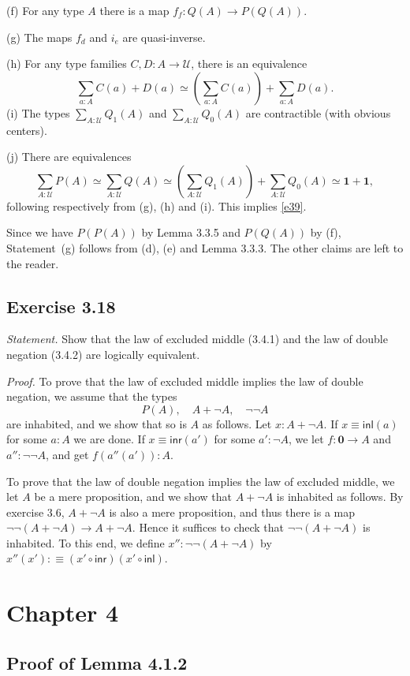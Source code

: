 \documentclass[12pt]{article}
\newcommand{\mbf}{\mathbf}
\newcommand{\msf}{\mathsf}
\newcommand{\de}{:\equiv}
\newcommand{\ee}{\equiv}
\newcommand{\nn}{\noindent}
\newcommand{\U}{\mathcal U}
\begin{document}
\nn(f) For any type $A$ there is a map $f_f:Q(A)\to P(Q(A))$.

\nn(g) The maps $f_d$ and $i_e$ are quasi-inverse.

\nn(h) For any type families $C,D:A\to\U$, there is an equivalence 
$$
\sum_{a:A}C(a)+D(a)\simeq\left(\sum_{a:A}C(a)\right)+\sum_{a:A}D(a).
$$
\nn(i) The types $\sum_{A:\U}Q_1(A)$ and $\sum_{A:\U}Q_0(A)$ are contractible (with obvious centers).

\nn(j) There are equivalences 
$$
\sum_{A:\U}P(A)\simeq\sum_{A:\U}Q(A)\simeq\left(\sum_{A:\U}Q_1(A)\right)+\sum_{A:\U}Q_0(A)\simeq\mbf1+\mbf1,
$$ 
following respectively from (g), (h) and (i). This implies \eqref{e39}.

Since we have $P(P(A))$ by Lemma 3.3.5 and $P(Q(A))$ by (f), Statement~(g) follows from (d), (e) and Lemma 3.3.3. The other claims are left to the reader.


\subsection{Exercise 3.18}

\emph{Statement.} Show that the law of excluded middle (3.4.1) and the law of double negation (3.4.2) are logically equivalent.

\nn\emph{Proof.} To prove that the law of excluded middle implies the law of double negation, we assume that the types 
$$
P(A),\quad A+\neg A,\quad \neg\neg A
$$ 
are inhabited, and we show that so is $A$ as follows. Let $x:A+\neg A$. If $x\ee\msf{inl}(a)$ for some $a:A$ we are done. If $x\ee\msf{inr}(a')$ for some $a':\neg A$, we let $f:\mbf0\to A$ and $a'':\neg\neg A$, and get $f(a''(a')):A$. 

To prove that the law of double negation implies the law of excluded middle, we let $A$ be a mere proposition, and we show that $A+\neg A$ is inhabited as follows. By exercise 3.6, $A+\neg A$ is also a mere proposition, and thus there is a map $\neg\neg(A+\neg A)\to A+\neg A$. Hence it suffices to check that $\neg\neg(A+\neg A)$ is inhabited. To this end, we define $x'':\neg\neg(A+\neg A)$ by $x''(x')\de(x'\circ\msf{inr})(x'\circ\msf{inl})$.


\section{Chapter 4}

\subsection{Proof of Lemma 4.1.2}
\end{document}
